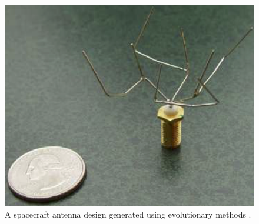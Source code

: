 \begin{figure}
  \includegraphics[width=\textwidth]{img/evolved_antenna} 
  \hspace{2ex}
  \caption{A spacecraft antenna design generated using evolutionary methods \cite[Figure 2(a)]{Hornby2006AutomatedAlgorithms}.}
  \label{fig:evolved_antenna}
\end{figure}